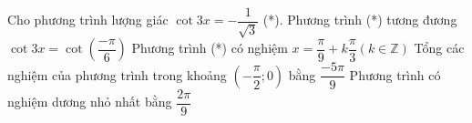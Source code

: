 \begin{ex}%
	Cho phương trình lượng  giác $\cot 3x=-\dfrac{1}{\sqrt{3}}$ (*).
	 \choiceTF
		{Phương trình (*) tương đương  $\cot 3x=\cot \left(\dfrac{-\pi}{6}\right)$}
		{Phương trình (*) có nghiệm  $x=\dfrac{\pi}{9}+k\dfrac{\pi}{3}(k\in \mathbb{Z})$}
		{\True Tổng các  nghiệm của phương trình trong khoảng $\left(-\dfrac{\pi}{2};0\right)$ bằng $\dfrac{-5\pi}{9}$}
		{\True Phương trình có nghiệm  dương nhỏ nhất bằng $\dfrac{2\pi}{9}$}
\end{ex}

